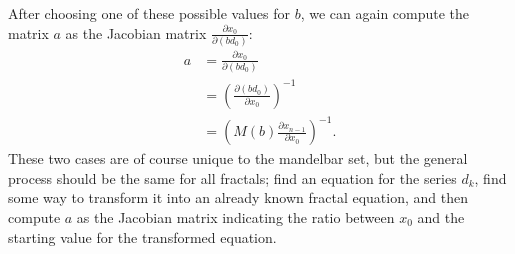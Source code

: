 \documentclass[12pt,a4paper]{article}
\newcommand{\eqar}[1]{\begin{align*} #1 \end{align*}}
\newcommand{\jmat}[2]{\frac{\partial #1}{\partial #2}}
\begin{document}
After choosing one of these possible values for $b$, we can again compute the matrix $a$ as the Jacobian matrix $\jmat{x_0}{(bd_0)}$:
\eqar{
	a &= \jmat{x_0}{(bd_0)}\\
	&= \left(\jmat{(bd_0)}{x_0}\right)^{-1}\\
	&= \left(M(b)\jmat{x_{n-1}}{x_0}\right)^{-1}.
}
These two cases are of course unique to the mandelbar set, but the general process should be the same for all fractals; find an equation for the series $d_k$, find some way to transform it into an already known fractal equation, and then compute $a$ as the Jacobian matrix indicating the ratio between $x_0$ and the starting value for the transformed equation.
\end{document}
